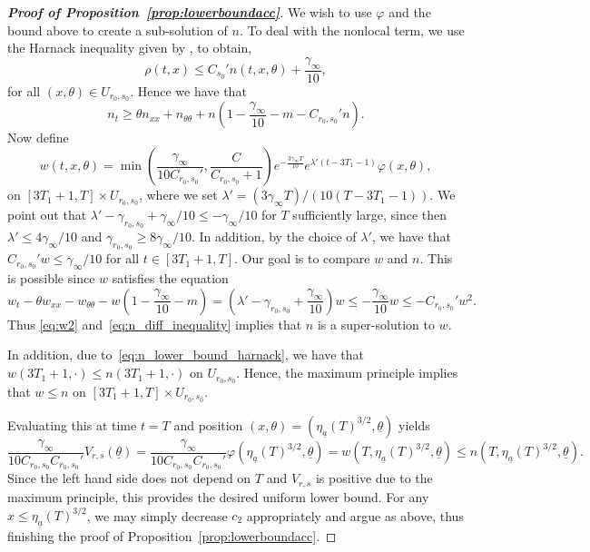 \documentclass[11pt]{article}    %
\begin{document}
\begin{proof}[{\bf Proof of Proposition~\ref{prop:lowerboundacc}}]
We wish to use $\varphi$ and the bound above to create a sub-solution of $n$.
To deal with the nonlocal term, we use the Harnack inequality given by , to obtain,
\[
	\rho(t,x) \leq C_{s_0}' n(t,x,\theta) + \frac{\gamma_\infty}{10},
\]
for all $(x,\theta) \in U_{r_0,s_0}$.  Hence we have that
\begin{equation}\label{eq:n_diff_inequality}
n_t \geq \theta n_{xx} + n_{\theta\theta} + n \left(1 - \frac{\gamma_\infty}{10} - m - C_{r_0,s_0}' n \right).
\end{equation}
Now define
\[
	w(t,x,\theta) = \min\left(\frac{\gamma_\infty}{10C_{r_0,s_0}'},\frac{C}{C_{r_0,s_0} +1} \right) e^{-\frac{3\gamma_\infty T}{10}} e^{\lambda'(t - 3T_1 - 1)} \varphi(x,\theta),
\]
on $[3T_1 + 1, T]\times U_{r_0,s_0}$, where we set $\lambda' = (3\gamma_\infty T)/(10(T - 3T_1 - 1)).$ We point out that $\lambda' - \gamma_{r_0,s_0} + \gamma_\infty/10 \leq -\gamma_\infty/10$ for $T$ sufficiently large, since then $\lambda' \leq 4\gamma_\infty/10$ and $\gamma_{r_0,s_0} \geq 8\gamma_\infty/10$.  In addition, by the choice of $\lambda'$, we have that $C_{r_0,s_0}' w \leq \gamma_\infty/10$ for all $t \in [3T_1+1,T]$.  Our goal is to compare $w$ and $n$.  This is possible since $w$ satisfies the equation
\begin{equation}\label{eq:w2}
	w_t - \theta w_{xx} - w_{\theta\theta} - w\left(1 - \frac{\gamma_\infty}{10}- m\right)
		= \left(\lambda' - \gamma_{r_0,s_0} + \frac{\gamma_\infty}{10} \right)w \leq - \frac{\gamma_\infty}{10} w  \leq -C_{r_0,s_0}' w^2.
\end{equation}
Thus \eqref{eq:w2} and~\eqref{eq:n_diff_inequality} implies that $n$ is a super-solution to $w$.


In addition, due to~\eqref{eq:n_lower_bound_harnack}, we have that $w(3T_1+1,\cdot) \leq n(3T_1+1,\cdot)$ on $U_{r_0,s_0}$.  Hence, the maximum principle implies that $w \leq n$ on $[3T_1+1,T]\times U_{r_0,s_0}$.  

Evaluating this at time $t = T$ and position $(x,\theta) = (\eta_{\underline a}(T)^{3/2},\underline\theta)$ yields
\[
		{\frac{\gamma_\infty}{10C_{r_0,s_0} C_{r_0,s_0}'}V_{r,s}(\underline\theta)}
		=\frac{\gamma_\infty}{10C_{r_0,s_0} C_{r_0,s_0}'} \varphi(\eta_{\underline a}(T)^{3/2}, \underline\theta)
		= w(T, \eta_{\underline a}(T)^{3/2}, \underline\theta) \leq n(T,{\eta_{\underline a}(T)^{3/2}},\underline\theta).
\]
Since the left hand side does not depend on $T$ and {$V_{r,s}$ is positive due to the maximum principle}, this provides the desired uniform lower bound.  For any $x \leq \eta_{\underline a}(T)^{3/2}$, we may simply decrease $c_2$ appropriately and argue as above, thus finishing the proof of Proposition~\ref{prop:lowerboundacc}.
\end{proof}
\end{document}
